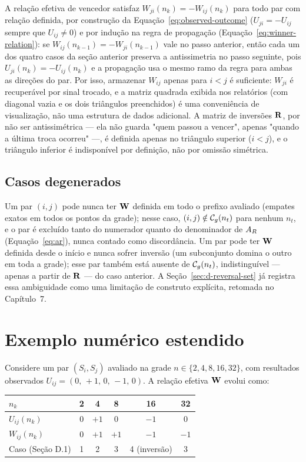 A relação efetiva de vencedor satisfaz $W_{ji}(n_k)=-W_{ij}(n_k)$ para todo par com relação definida, por construção da Equação~\eqref{eq:observed-outcome} ($U_{ji}=-U_{ij}$ sempre que $U_{ij}\neq0$) e por indução na regra de propagação (Equação~\eqref{eq:winner-relation}): se $W_{ij}(n_{k-1})=-W_{ji}(n_{k-1})$ vale no passo anterior, então cada um dos quatro casos da seção anterior preserva a antissimetria no passo seguinte, pois $U_{ji}(n_k)=-U_{ij}(n_k)$ e a propagação usa o mesmo ramo da regra para ambas as direções do par. Por isso, armazenar $W_{ij}$ apenas para $i<j$ é suficiente: $W_{ji}$ é recuperável por sinal trocado, e a matriz quadrada exibida nos relatórios (com diagonal vazia e os dois triângulos preenchidos) é uma conveniência de visualização, não uma estrutura de dados adicional. A matriz de inversões $\mathbf{R}$, por não ser antissimétrica --- ela não guarda "quem passou a vencer", apenas "quando a última troca ocorreu" ---, é definida apenas no triângulo superior ($i<j$), e o triângulo inferior é indisponível por definição, não por omissão simétrica.

\subsection{Casos degenerados}

Um par $(i,j)$ pode nunca ter $\mathbf{W}$ definida em todo o prefixo avaliado (empates exatos em todos os pontos da grade); nesse caso, $(i,j)\notin\mathcal{C}_g(n_t)$ para nenhum $n_t$, e o par é excluído tanto do numerador quanto do denominador de $A_R$ (Equação~\eqref{eq:ar}), nunca contado como discordância. Um par pode ter $\mathbf{W}$ definida desde o início e nunca sofrer inversão (um subconjunto domina o outro em toda a grade); esse par também está ausente de $\mathcal{C}_g(n_t)$, indistinguível --- apenas a partir de $\mathbf{R}$ --- do caso anterior. A Seção~\ref{sec:d-reversal-set} já registra essa ambiguidade como uma limitação de construto explícita, retomada no Capítulo~7.

\section{Exemplo numérico estendido}

Considere um par $(S_i,S_j)$ avaliado na grade $n\in\{2,4,8,16,32\}$, com resultados observados $U_{ij}=(0,\,+1,\,0,\,-1,\,0)$. A relação efetiva $\mathbf{W}$ evolui como:

\begin{center}
\begin{tabular}{lccccc}
\toprule
$n_k$ & 2 & 4 & 8 & 16 & 32 \\
\midrule
$U_{ij}(n_k)$ & $0$ & $+1$ & $0$ & $-1$ & $0$ \\
$W_{ij}(n_k)$ & $0$ & $+1$ & $+1$ & $-1$ & $-1$ \\
Caso (Seção D.1) & 1 & 2 & 3 & 4 (inversão) & 3 \\
\bottomrule
\end{tabular}
\end{center}

